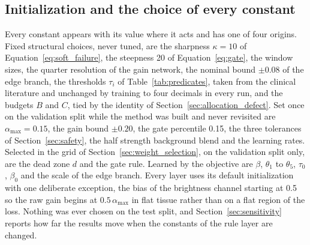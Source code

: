 \subsection{Initialization and the choice of every constant}
\label{sec:constants}
Every constant appears with its value where it acts and has one of four origins. Fixed structural
choices, never tuned, are the sharpness $\kappa = 10$ of
Equation~\eqref{eq:soft_failure}, the steepness 20 of Equation~\eqref{eq:gate}, the window sizes, the
quarter resolution of the gain network, the nominal bound $\pm 0.08$ of the edge branch, the
thresholds $\tau_i$ of Table~\ref{tab:predicates}, taken from the clinical literature and unchanged by
training to four decimals in every run, and the budgets
$B$ and $C$, tied by the identity of Section~\ref{sec:allocation_defect}. Set once on the validation
split while the method was built and never revisited are $\alpha_{\max} = 0.15$, the gain bound
$\pm 0.20$, the gate percentile 0.15, the three tolerances of Section~\ref{sec:safety}, the half
strength background blend and the learning rates. Selected in the grid of
Section~\ref{sec:weight_selection}, on the validation split only, are the dead zone $d$ and the gate
rule. Learned by the objective are $\beta$, $\theta_1$ to $\theta_5$, $\tau_0$, $\beta_0$ and the
scale of the edge branch. Every layer uses its default initialization with one deliberate exception,
the bias of the brightness channel starting at 0.5 so the raw gain begins at
$0.5\,\alpha_{\max}$ in flat tissue rather than on a flat region of the loss. Nothing was ever chosen
on the test split, and Section~\ref{sec:sensitivity} reports how far the results move when the
constants of the rule layer are changed.


